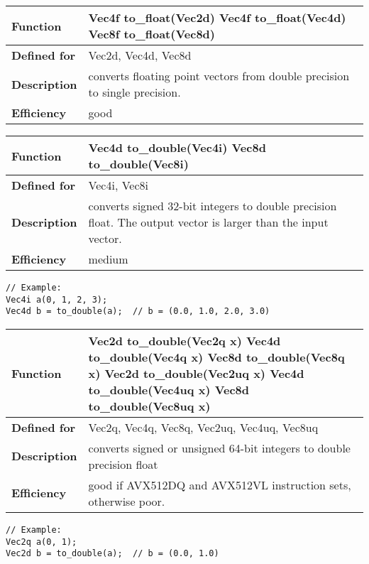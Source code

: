 \documentclass[vcl_manual.tex]{subfiles}
\begin{document}
\begin{tabular}{|p{30mm}|p{120mm}|}
\hline
\bfseries Function & 
Vec4f to\_float(Vec2d) \newline
Vec4f to\_float(Vec4d) \newline
Vec8f to\_float(Vec8d) \\ \hline
\bfseries Defined for & Vec2d, Vec4d, Vec8d \\ \hline
\bfseries Description & converts floating point vectors from double precision to single precision. \\ \hline
\bfseries Efficiency & good \\ \hline
\end{tabular}

\begin{tabular}{|p{30mm}|p{120mm}|}
\hline
\bfseries Function & 
Vec4d to\_double(Vec4i) \newline
Vec8d to\_double(Vec8i) \\ \hline
\bfseries Defined for & Vec4i, Vec8i \\ \hline
\bfseries Description & converts signed 32-bit integers to double precision float. The output vector is larger than the input vector. \\ \hline
\bfseries Efficiency & medium \\ \hline
\end{tabular}
\begin{lstlisting}[frame=none]
// Example:
Vec4i a(0, 1, 2, 3);
Vec4d b = to_double(a);  // b = (0.0, 1.0, 2.0, 3.0)
\end{lstlisting}


\begin{tabular}{|p{30mm}|p{120mm}|}
\hline
\bfseries Function & 
Vec2d to\_double(Vec2q x) \newline
Vec4d to\_double(Vec4q x) \newline
Vec8d to\_double(Vec8q x) \newline 
Vec2d to\_double(Vec2uq x) \newline
Vec4d to\_double(Vec4uq x) \newline
Vec8d to\_double(Vec8uq x) \\ \hline
\bfseries Defined for & Vec2q, Vec4q, Vec8q, Vec2uq, Vec4uq, Vec8uq \\ \hline
\bfseries Description & converts signed or unsigned 64-bit integers to double precision float \\ \hline
\bfseries Efficiency & good if AVX512DQ and AVX512VL instruction sets, otherwise poor. \\ \hline
\end{tabular}
\begin{lstlisting}[frame=none]
// Example:
Vec2q a(0, 1);
Vec2d b = to_double(a);  // b = (0.0, 1.0)
\end{lstlisting}
\end{document}
